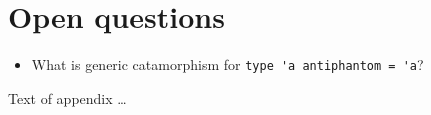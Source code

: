 \documentclass[acmsmall,review,anonymous]{acmart}\settopmatter{printfolios=true,printccs=false,printacmref=false}
\begin{document}
\section{Open questions}
\begin{itemize}
 \item What is generic catamorphism for \lstinline{type 'a antiphantom = 'a}? 
\end{itemize}


%


Text of appendix \ldots
\end{document}
